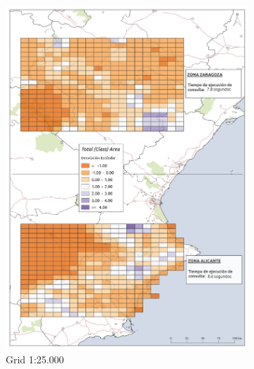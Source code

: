 \begin{figure}
  \centering
  \begin{subfigure}[b]{0.4\textwidth}
    \includegraphics[width=\textwidth]{ResultadosyDiscusion/Figs/Results/c_25.pdf}
    \caption{Grid 1:25.000}
    \label{fig:c_25}   
  \end{subfigure}             
  \begin{subfigure}[b]{0.4\textwidth}

\end{subfigure}
\end{figure}

